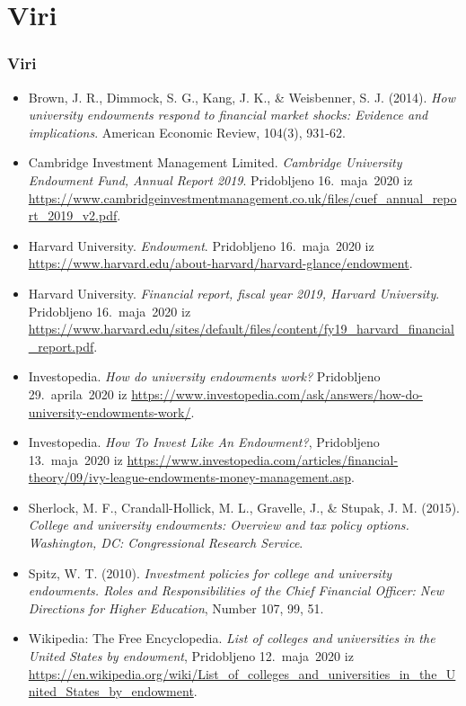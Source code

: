 \documentclass[10pt]{beamer}
\begin{document}
\section{Viri}
\begin{frame}
\frametitle{Viri}
\begin{itemize}

\item Brown, J. R., Dimmock, S. G., Kang, J. K., \& Weisbenner, S. J. (2014). \textit{How university endowments respond to financial market shocks: Evidence and implications}. American Economic Review, 104(3), 931-62.

\item Cambridge Investment Management Limited. \emph{Cambridge University Endowment Fund, Annual Report 2019}. Pridobljeno 16.~maja~2020 iz \url{https://www.cambridgeinvestmentmanagement.co.uk/files/cuef_annual_report_2019_v2.pdf}.

\item Harvard University. \emph{Endowment}. Pridobljeno 16.~maja~2020 iz \url{https://www.harvard.edu/about-harvard/harvard-glance/endowment}.

\item Harvard University. \emph{Financial report, fiscal year 2019, Harvard University}. Pridobljeno 16.~maja~2020 iz \url{https://www.harvard.edu/sites/default/files/content/fy19_harvard_financial_report.pdf}.
\end{itemize}
\end{frame}

\begin{frame}
\begin{itemize}
\item Investopedia. \emph{How do university endowments work?} Pridobljeno 29.~aprila~2020 iz \url{https://www.investopedia.com/ask/answers/how-do-university-endowments-work/}.

\item Investopedia. \emph{How To Invest Like An Endowment?}, Pridobljeno 13.~maja~2020 iz \url{https://www.investopedia.com/articles/financial-theory/09/ivy-league-endowments-money-management.asp}.

\item Sherlock, M. F., Crandall-Hollick, M. L., Gravelle, J., \& Stupak, J. M. (2015). \textit{College and university endowments: Overview and tax policy options. Washington, DC: Congressional Research Service}.

\item Spitz, W. T. (2010). \emph{Investment policies for college and university endowments. Roles and Responsibilities of the Chief Financial Officer: New Directions for Higher Education}, Number 107, 99, 51.

\item Wikipedia: The Free Encyclopedia. \emph{List of colleges and universities in the United States by endowment},  Pridobljeno 12.~maja~2020 iz \url{https://en.wikipedia.org/wiki/List_of_colleges_and_universities_in_the_United_States_by_endowment}.
\end{itemize}
\end{frame}
\end{document}
